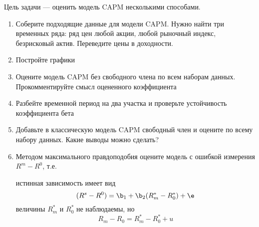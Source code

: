 \documentclass[pdftex,11pt,openany]{book}\usepackage[]{graphicx}\usepackage[]{color}
\begin{document}
\begin{solution}
\end{solution}

\begin{problem}
 Цель задачи --- оценить модель CAPM несколькими способами. 
\begin{enumerate}
\item Соберите подходящие данные для модели CAPM. Нужно найти три временных ряда: ряд цен любой акции, любой рыночный индекс, безрисковый актив. Переведите цены в доходности.
\item Постройте графики
\item Оцените модель CAPM без свободного члена по всем наборам данных. Прокомментируйте смысл оцененного коэффициента
\item Разбейте временной период на два участка и проверьте устойчивость коэффициента бета
\item Добавьте в классическую модель CAPM свободный член и оцените по всему набору данных. Какие выводы можно сделать? 
\item Методом максимального правдоподобия оцените модель с ошибкой измерения $R^m-R^0$, т.е.

истинная зависимость имеет вид 
\begin{equation}
(R^s-R^0)=\b_1+\b_2(R_m^*-R_0^*)+\e
\end{equation}
величины $R_m^*$ и $R_0^*$ не наблюдаемы, но 
\begin{equation}
R_m-R_0=R_m^*-R_0^*+u
\end{equation}

\end{enumerate}
\end{problem}

\begin{solution}
\end{solution}
\end{document}
